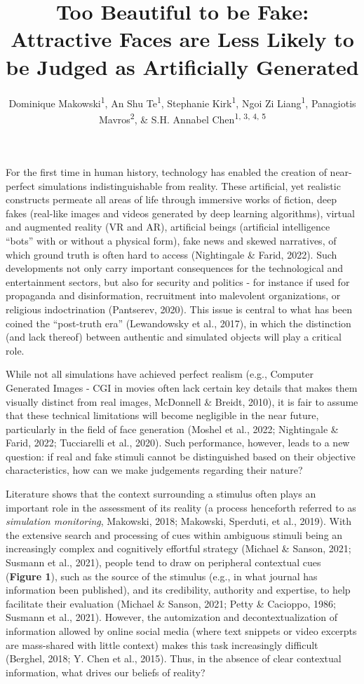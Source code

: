 \documentclass[
  man,mask,floatsintext]{apa6}
\title{\textbf{Too Beautiful to be Fake: Attractive Faces are Less Likely to be Judged as Artificially Generated}}
\author{Dominique Makowski\textsuperscript{1}, An Shu Te\textsuperscript{1}, Stephanie Kirk\textsuperscript{1}, Ngoi Zi Liang\textsuperscript{1}, Panagiotis Mavros\textsuperscript{2}, \& S.H. Annabel Chen\textsuperscript{1, 3, 4, 5}}
\date{}
\affiliation{\vspace{0.5cm}\textsuperscript{1} School of Social Sciences, Nanyang Technological University, Singapore\\\textsuperscript{2} Singapore-ETH Centre, Future Cities Laboratory, Singapore\\\textsuperscript{3} LKC Medicine, Nanyang Technological University, Singapore\\\textsuperscript{4} National Institute of Education, Singapore\\\textsuperscript{5} Centre for Research and Development in Learning, Nanyang Technological University, Singapore}
\begin{document}
\maketitle

For the first time in human history, technology has enabled the creation of near-perfect simulations indistinguishable from reality. These artificial, yet realistic constructs permeate all areas of life through immersive works of fiction, deep fakes (real-like images and videos generated by deep learning algorithms), virtual and augmented reality (VR and AR), artificial beings (artificial intelligence ``bots'' with or without a physical form), fake news and skewed narratives, of which ground truth is often hard to access (Nightingale \& Farid, 2022). Such developments not only carry important consequences for the technological and entertainment sectors, but also for security and politics - for instance if used for propaganda and disinformation, recruitment into malevolent organizations, or religious indoctrination (Pantserev, 2020). This issue is central to what has been coined the ``post-truth era'' (Lewandowsky et al., 2017), in which the distinction (and lack thereof) between authentic and simulated objects will play a critical role.

While not all simulations have achieved perfect realism (e.g., Computer Generated Images - CGI in movies often lack certain key details that makes them visually distinct from real images, McDonnell \& Breidt, 2010), it is fair to assume that these technical limitations will become negligible in the near future, particularly in the field of face generation (Moshel et al., 2022; Nightingale \& Farid, 2022; Tucciarelli et al., 2020). Such performance, however, leads to a new question: if real and fake stimuli cannot be distinguished based on their objective characteristics, how can we make judgements regarding their nature?

Literature shows that the context surrounding a stimulus often plays an important role in the assessment of its reality (a process henceforth referred to as \emph{simulation monitoring}, Makowski, 2018; Makowski, Sperduti, et al., 2019). With the extensive search and processing of cues within ambiguous stimuli being an increasingly complex and cognitively effortful strategy (Michael \& Sanson, 2021; Susmann et al., 2021), people tend to draw on peripheral contextual cues (\textbf{Figure 1}), such as the source of the stimulus (e.g., in what journal has information been published), and its credibility, authority and expertise, to help facilitate their evaluation (Michael \& Sanson, 2021; Petty \& Cacioppo, 1986; Susmann et al., 2021). However, the automization and decontextualization of information allowed by online social media (where text snippets or video excerpts are mass-shared with little context) makes this task increasingly difficult (Berghel, 2018; Y. Chen et al., 2015). Thus, in the absence of clear contextual information, what drives our beliefs of reality?
\end{document}
